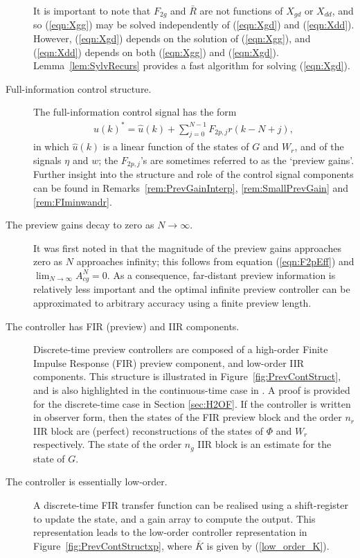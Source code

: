 \documentclass[a4paper,12pt]{article}
\theoremstyle{remark}
\newcommand{\als}[1]{\begin{align*} #1 \end{align*}}
\begin{document}
\begin{description}
It is important to note that $F_{2g}$ and $\bar R$ are not functions of $X_{gd}$ or $X_{dd}$, and so (\ref{eqn:Xgg}) may be solved independently of (\ref{eqn:Xgd}) and (\ref{eqn:Xdd}). However, (\ref{eqn:Xgd}) depends on the solution of (\ref{eqn:Xgg}), and (\ref{eqn:Xdd}) depends on both (\ref{eqn:Xgg}) and (\ref{eqn:Xgd}). Lemma~\ref{lem:SylvRecurs} provides a fast algorithm for solving (\ref{eqn:Xgd}).
\item[Full-information control structure.] The full-information control signal has the form
\als{
u(k)^*=\hat u(k)+\sum_{j=0}^{N-1}{F_{2p,j}r(k-N+j)},
}
in which $\hat u(k)$ is a linear function of the states of $G$ and $W_r$, and of the signals $\eta$ and $w$; the $F_{2p,j}$'s are sometimes referred to as the `preview gains'. Further insight into the structure and role of the control signal components can be found in Remarks~\ref{rem:PrevGainInterp}, \ref{rem:SmallPrevGain} and \ref{rem:FIminwandr}.
\item[The preview gains decay to zero as $N \rightarrow \infty$.] It was first noted in \cite{Tomizuka_1975_OptDiscretePreview} that the magnitude of the preview gains approaches zero as $N$ approaches infinity; this follows from equation (\ref{eqn:F2pEff}) and $\lim_{N \rightarrow \infty} A^N_{cg} = 0$. As a consequence, far-distant preview information is relatively less important and the optimal infinite preview controller can be approximated  to arbitrary accuracy using a finite preview length.
\item[The controller has FIR (preview) and IIR components.]
Discrete-time preview controllers are composed of a high-order Finite Impulse Response (FIR) preview component, and low-order {IIR} components. This structure is illustrated in Figure~\ref{fig:PrevContStruct}, and is also highlighted in the continuous-time case in \cite{Moelja_2006_H2PreviewMultiple}. A proof is provided for the discrete-time case in Section \ref{sec:H2OF}. If the controller is written in observer form, then the states of the FIR preview block and the order $n_r$ IIR block are (perfect) reconstructions of the states of $\Phi$ and $W_r$ respectively. The state of the order $n_g$ IIR block is an estimate for the state of $G$.
\item[The controller is essentially low-order.] 
A discrete-time FIR transfer function can be realised using a shift-register to update the state, and a gain array to compute the output. This representation leads to the low-order controller representation in Figure~\ref{fig:PrevContStructxp}, where $\bar{K}$ is given by (\ref{low_order_K}). 

\end{description}
\end{document}
